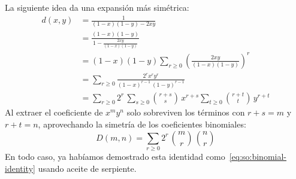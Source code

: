   La siguiente idea da una expansión más simétrica:
  \begin{align*}
    d(x, y)
      &= \frac{1}{(1 - x) (1 - y) - 2 x y} \\
      &= \frac{(1 - x) (1 - y)}{1 - \frac{2 x y}{(1 - x) (1 - y)}} \\
      &= (1 - x) (1 - y)
	   \sum_{r \ge 0} \left( \frac{2 x y}{(1 - x) (1 - y)} \right)^r \\
      &= \sum_{r \ge 0}
	  \frac{2^r x^r y^r}{(1 - x)^{r - 1} \, (1 - y)^{r - 1}} \\
      &= \sum_{r \ge 0} 2^r \,
	   \sum_{s \ge 0} \binom{r + s}{s} \, x^{r + s}
	   \sum_{t \ge 0} \binom{r + t}{t} \, y^{r + t}
  \end{align*}
  Al extraer el coeficiente de \(x^m y^n\)
  solo sobreviven los términos con \(r + s = m\) y \(r + t = n\),
  aprovechando la simetría de los coeficientes binomiales:
  \begin{equation}
    \label{eq:Delannoy-alt}
    D(m, n)
      = \sum_{r \ge 0} 2^r \, \binom{m}{r} \, \binom{n}{r}
  \end{equation}
  En todo caso,
  ya habíamos demostrado esta identidad como~\eqref{eq:so:binomial-identity}
  usando aceite de serpiente.

